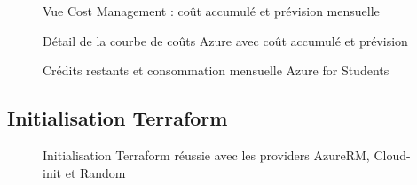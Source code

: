 \begin{figure}[H]
\centering
{}
\caption{Vue Cost Management : coût accumulé et prévision mensuelle}
\label{fig:azure_cost_accumulated_scope}
\end{figure}

\begin{figure}[H]
\centering
{}
\caption{Détail de la courbe de coûts Azure avec coût accumulé et prévision}
\label{fig:azure_cost_forecast_detail}
\end{figure}

\begin{figure}[H]
\centering
{}
\caption{Crédits restants et consommation mensuelle Azure for Students}
\label{fig:azure_student_offer_details}
\end{figure}

\subsection{Initialisation Terraform}

\begin{figure}[H]
\centering
{}
\caption{Initialisation Terraform réussie avec les providers AzureRM, Cloud-init et Random}
\label{fig:terraform_init_success}
\end{figure}
